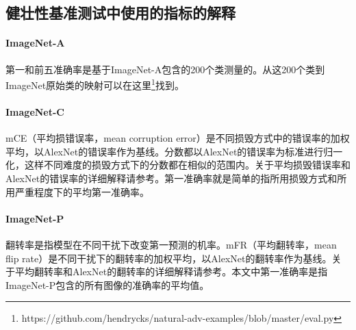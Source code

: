 \documentclass[10pt]{article}
\begin{document}
\subsection{健壮性基准测试中使用的指标的解释}
\paragraph{ImageNet-A} 
第一和前五准确率是基于ImageNet-A包含的200个类测量的。从这200个类到ImageNet原始类的映射可以在这里\footnote{https://github.com/hendrycks/natural-adv-examples/blob/master/eval.py}找到。

\paragraph{ImageNet-C}
mCE（平均损错误率，mean corruption error）是不同损毁方式中的错误率的加权平均，以AlexNet的错误率作为基线。分数都以AlexNet的错误率为标准进行归一化，这样不同难度的损毁方式下的分数都在相似的范围内。关于平均损毁错误率和AlexNet的错误率的详细解释请参考\cite{hendrycks2018benchmarking}。第一准确率就是简单的指所用损毁方式和所用严重程度下的平均第一准确率。

\paragraph{ImageNet-P} 
翻转率是指模型在不同干扰下改变第一预测的机率。mFR（平均翻转率，mean flip rate）是不同干扰下的翻转率的加权平均，以AlexNet的翻转率作为基线。关于平均翻转率和AlexNet的翻转率的详细解释请参考\cite{hendrycks2018benchmarking}。本文中第一准确率是指ImageNet-P包含的所有图像的准确率的平均值。
\end{document}
